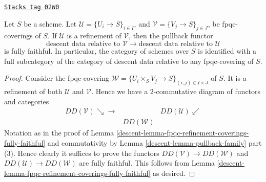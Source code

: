 \begin{lemma}
\label{descent-lemma-refine-coverings-fully-faithful}
\href{https://stacks.math.columbia.edu/tag/02W0}{\texttt{Stacks tag 02W0}}

Let $S$ be a scheme.
Let $\mathcal{U} = \{U_i \to S\}_{i \in I}$, and
$\mathcal{V} = \{V_j \to S\}_{j \in J}$,
be fpqc-coverings of $S$.
If $\mathcal{U}$ is a refinement of $\mathcal{V}$,
then the pullback functor
$$
\text{descent data relative to }
\mathcal{V}
\longrightarrow
\text{descent data relative to }
\mathcal{U}
$$
is fully faithful.
In particular, the category of schemes over $S$
is identified with a full subcategory of the category
of descent data relative to any fpqc-covering of $S$.
\end{lemma}

\begin{proof}

Consider the fpqc-covering
$\mathcal{W} = \{U_i \times_S V_j \to S\}_{(i, j) \in I \times J}$ of $S$.
It is a refinement of both $\mathcal{U}$ and $\mathcal{V}$.
Hence we have a $2$-commutative diagram of functors and categories
$$
\begin{array}{ccc}DD(\mathcal{V}) \searrow\longrightarrow &  & DD(\mathcal{U}) \swarrow \\  & DD(\mathcal{W}) & \end{array}
$$
Notation as in the proof of
Lemma \ref{descent-lemma-fpqc-refinement-coverings-fully-faithful} and
commutativity by Lemma \ref{descent-lemma-pullback-family} part (3).
Hence clearly it suffices to prove the functors
$DD(\mathcal{V}) \to DD(\mathcal{W})$ and
$DD(\mathcal{U}) \to DD(\mathcal{W})$ are fully faithful.
This follows from
Lemma \ref{descent-lemma-fpqc-refinement-coverings-fully-faithful}
as desired.
\end{proof}

